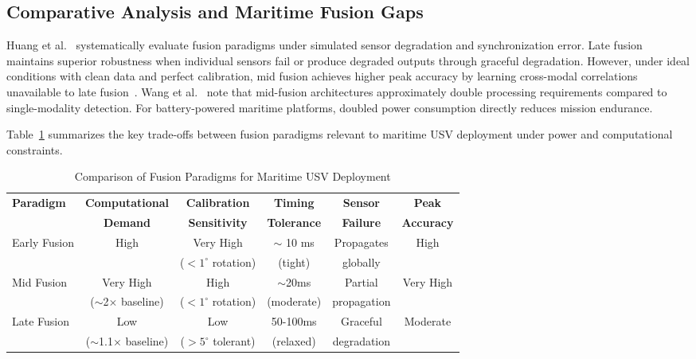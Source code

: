 \documentclass[../main.tex]{subfiles}
\begin{document}
\subsection{Comparative Analysis and Maritime Fusion Gaps}

Huang et al.~\cite{huang2024} systematically evaluate fusion paradigms under simulated sensor degradation and synchronization error.
Late fusion maintains superior robustness when individual sensors fail or produce degraded outputs through graceful degradation.
However, under ideal conditions with clean data and perfect calibration, mid fusion achieves higher peak accuracy by learning cross-modal correlations unavailable to late fusion~\cite{huang2024}.
Wang et al.~\cite{wang2020a} note that mid-fusion architectures approximately double processing requirements compared to single-modality detection.
For battery-powered maritime platforms, doubled power consumption directly reduces mission endurance.

Table~\ref{tab:fusion_comparison} summarizes the key trade-offs between fusion paradigms relevant to maritime USV deployment under power and computational constraints.

\begin{table}[htbp]
\centering
\caption{Comparison of Fusion Paradigms for Maritime USV Deployment}
\label{tab:fusion_comparison}
\small
\begin{tabular}{lccccc}
\hline
\textbf{Paradigm} & \textbf{Computational} & \textbf{Calibration} & \textbf{Timing} & \textbf{Sensor} & \textbf{Peak} \\
                  & \textbf{Demand} & \textbf{Sensitivity} & \textbf{Tolerance} & \textbf{Failure} & \textbf{Accuracy} \\
\hline
Early Fusion & High & Very High & $\sim$ 10 ms & Propagates & High \\
             &      & ($<1^\circ$ rotation) & (tight) & globally &  \\
Mid Fusion & Very High & High & $\sim$20ms & Partial & Very High \\
           & ($\sim$2$\times$ baseline) & ($<1^\circ$ rotation) & (moderate) & propagation &  \\
Late Fusion & Low & Low & 50-100ms & Graceful & Moderate \\
            & ($\sim$1.1$\times$ baseline) & ($>5^\circ$ tolerant) & (relaxed) & degradation &  \\
\hline
\end{tabular}
\end{table}
\end{document}
